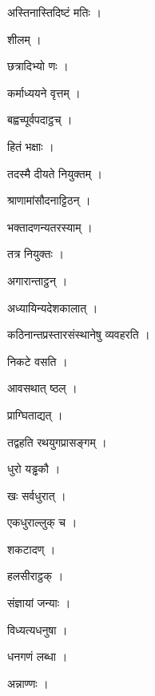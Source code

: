 \documentclass[10pt, openany]{book}
\begin{document}
\noindent अस्तिनास्तिदिष्टं मतिः ।

\noindent शीलम् ।

\noindent छत्रादिभ्यो णः ।

\noindent कर्माध्ययने वृत्तम् ।

\noindent बह्वच्पूर्वपदाट्ठच् ।

\noindent हितं भक्षाः ।

\noindent तदस्मै दीयते नियुक्तम् ।

\noindent श्राणामांसौदनाट्टिठन् ।

\noindent भक्तादणन्यतरस्याम् ।

\noindent तत्र नियुक्तः ।

\noindent अगारान्ताट्ठन् ।

\noindent अध्यायिन्यदेशकालात् ।

\noindent कठिनान्तप्रस्तारसंस्थानेषु व्यवहरति ।

\noindent निकटे वसति ।

\noindent आवसथात् ष्ठल् ।

\noindent प्राग्घिताद्यत् ।

\noindent तद्वहति रथयुगप्रासङ्गम् ।

\noindent धुरो यड्ढकौ ।

\noindent खः सर्वधुरात् ।

\noindent एकधुराल्लुक् च ।

\noindent शकटादण् ।

\noindent हलसीराट्ठक् ।

\noindent संज्ञायां जन्याः ।

\noindent विध्यत्यधनुषा ।

\noindent धनगणं लब्धा ।

\noindent अन्नाण्णः ।
\end{document}
